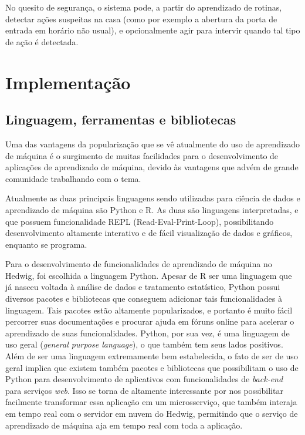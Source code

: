 		No quesito de segurança, o sistema pode, a partir do aprendizado de rotinas, detectar ações suspeitas na casa (como por exemplo a abertura da porta de entrada em horário não usual), e opcionalmente agir para intervir quando tal tipo de ação é detectada.


	\section{Implementação}

		\subsection{Linguagem, ferramentas e bibliotecas}

			Uma das vantagens da popularização que se vê atualmente do uso de aprendizado de máquina é o surgimento de muitas facilidades para o desenvolvimento de aplicações de aprendizado de máquina, devido às vantagens que advém de grande comunidade trabalhando com o tema. 

			Atualmente as duas principais linguagens sendo utilizadas para ciência de dados e aprendizado de máquina são Python e R. As duas são linguagens interpretadas, e que possuem funcionalidade REPL (Read-Eval-Print-Loop), possibilitando desenvolvimento altamente interativo e de fácil visualização de dados e gráficos, enquanto se programa.

			Para o desenvolvimento de funcionalidades de aprendizado de máquina no Hedwig, foi escolhida a linguagem Python. Apesar de R ser uma linguagem que já nasceu voltada à análise de dados e tratamento estatístico, Python possui diversos pacotes e bibliotecas que conseguem adicionar tais funcionalidades à linguagem. Tais pacotes estão altamente popularizados, e portanto é muito fácil percorrer suas documentações e procurar ajuda em fóruns online para acelerar o aprendizado de suas funcionalidades. Python, por sua vez, é uma linguagem de uso geral (\emph{general purpose language}), o que também tem seus lados positivos. Além de ser uma linguagem extremamente bem estabelecida, o fato de ser de uso geral implica que existem também pacotes e bibliotecas que possibilitam o uso de Python para desenvolvimento de aplicativos com funcionalidades de \emph{back-end} para serviços \emph{web}. Isso se torna de altamente interessante por nos possibilitar facilmente transformar essa aplicação em um microsserviço, que também interaja em tempo real com o servidor em nuvem do Hedwig, permitindo que o serviço de aprendizado de máquina aja em tempo real com toda a aplicação.


